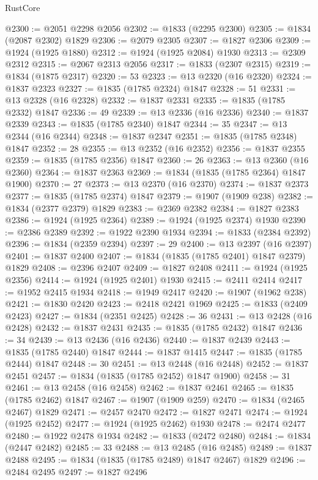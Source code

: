 \begin{lexlean}{RustCore}
\begin{coremodule}
@2300 := @2051 @2298 @2056
@2302 := @1833 (@2295 @2300)
@2305 := @1834 (@2087 @2302) @1829
@2306 := @2079 @2305
@2307 := @1827 @2306
@2309 := @1924 (@1925 @1880)
@2312 := @1924 (@1925 @2084) @1930
@2313 := @2309 @2312
@2315 := @2067 @2313 @2056
@2317 := @1833 (@2307 @2315)
@2319 := @1834 (@1875 @2317)
@2320 := 53
@2323 := @13 @2320 (@16 @2320)
@2324 := @1837 @2323
@2327 := @1835 (@1785 @2324) @1847
@2328 := 51
@2331 := @13 @2328 (@16 @2328)
@2332 := @1837 @2331
@2335 := @1835 (@1785 @2332) @1847
@2336 := 49
@2339 := @13 @2336 (@16 @2336)
@2340 := @1837 @2339
@2343 := @1835 (@1785 @2340) @1847
@2344 := 35
@2347 := @13 @2344 (@16 @2344)
@2348 := @1837 @2347
@2351 := @1835 (@1785 @2348) @1847
@2352 := 28
@2355 := @13 @2352 (@16 @2352)
@2356 := @1837 @2355
@2359 := @1835 (@1785 @2356) @1847
@2360 := 26
@2363 := @13 @2360 (@16 @2360)
@2364 := @1837 @2363
@2369 := @1834 (@1835 (@1785 @2364) @1847 @1900)
@2370 := 27
@2373 := @13 @2370 (@16 @2370)
@2374 := @1837 @2373
@2377 := @1835 (@1785 @2374) @1847
@2379 := @1907 (@1909 @238)
@2382 := @1834 (@2377 @2379) @1829
@2383 := @2369 @2382
@2384 := @1827 @2383
@2386 := @1924 (@1925 @2364)
@2389 := @1924 (@1925 @2374) @1930
@2390 := @2386 @2389
@2392 := @1922 @2390 @1934
@2394 := @1833 (@2384 @2392)
@2396 := @1834 (@2359 @2394)
@2397 := 29
@2400 := @13 @2397 (@16 @2397)
@2401 := @1837 @2400
@2407 := @1834 (@1835 (@1785 @2401) @1847 @2379) @1829
@2408 := @2396 @2407
@2409 := @1827 @2408
@2411 := @1924 (@1925 @2356)
@2414 := @1924 (@1925 @2401) @1930
@2415 := @2411 @2414
@2417 := @1952 @2415 @1934
@2418 := @1949 @2417
@2420 := @1907 (@1962 @238)
@2421 := @1830 @2420
@2423 := @2418 @2421 @1969
@2425 := @1833 (@2409 @2423)
@2427 := @1834 (@2351 @2425)
@2428 := 36
@2431 := @13 @2428 (@16 @2428)
@2432 := @1837 @2431
@2435 := @1835 (@1785 @2432) @1847
@2436 := 34
@2439 := @13 @2436 (@16 @2436)
@2440 := @1837 @2439
@2443 := @1835 (@1785 @2440) @1847
@2444 := @1837 @1415
@2447 := @1835 (@1785 @2444) @1847
@2448 := 30
@2451 := @13 @2448 (@16 @2448)
@2452 := @1837 @2451
@2457 := @1834 (@1835 (@1785 @2452) @1847 @1900)
@2458 := 31
@2461 := @13 @2458 (@16 @2458)
@2462 := @1837 @2461
@2465 := @1835 (@1785 @2462) @1847
@2467 := @1907 (@1909 @259)
@2470 := @1834 (@2465 @2467) @1829
@2471 := @2457 @2470
@2472 := @1827 @2471
@2474 := @1924 (@1925 @2452)
@2477 := @1924 (@1925 @2462) @1930
@2478 := @2474 @2477
@2480 := @1922 @2478 @1934
@2482 := @1833 (@2472 @2480)
@2484 := @1834 (@2447 @2482)
@2485 := 33
@2488 := @13 @2485 (@16 @2485)
@2489 := @1837 @2488
@2495 := @1834 (@1835 (@1785 @2489) @1847 @2467) @1829
@2496 := @2484 @2495
@2497 := @1827 @2496

\end{coremodule}
\end{lexlean}
